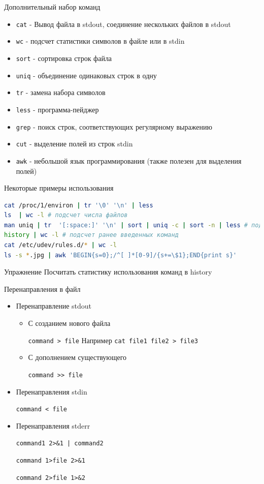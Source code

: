 \documentclass[ignorenonframetext, professionalfonts, hyperref={pdftex, unicode}]{beamer}
\begin{document}
\begin{frame}{Дополнительный набор команд}
  \begin{itemize}
    \item {\tt cat} - Вывод файла в stdout, соединение нескольких файлов в stdout
    \item {\tt wc} - подсчет статистики символов в файле или в stdin 
    \item {\tt sort} - сортировка строк файла
    \item {\tt uniq} - объединение одинаковых строк в одну
    \item {\tt tr} - замена набора символов
    \item {\tt less} - программа-пейджер
    \item {\tt grep} - поиск строк, соответствующих регулярному выражению
    \item {\tt cut} - выделение полей из строк stdin
    \item {\tt awk} - небольшой язык программирования (также полезен для выделения полей)
  \end{itemize}
\end{frame}

\begin{frame}[fragile]{Некоторые примеры использования}
\begin{lstlisting}[language=bash]
cat /proc/1/environ | tr '\0' '\n' | less
ls  | wc -l # подсчет числа файлов
man uniq | tr  '[:space:]' '\n' | sort | uniq -c | sort -n | less # подсчет количества слов в тексте man uniq
history | wc -l # подсчет ранее введенных команд
cat /etc/udev/rules.d/* | wc -l
ls -s *.jpg | awk 'BEGIN{s=0};/^[ ]*[0-9]/{s+=\$1};END{print s}' 
\end{lstlisting}
  \pause
  \begin{block}{Упражнение}
    Посчитать статистику использования команд в history
  \end{block}
\end{frame}

\begin{frame}{Перенаправления в файл}

\begin{itemize}
  \item Перенаправление stdout 
    \begin{itemize}
      \item С созданием нового файла

        {\tt command > file} Например {\tt cat file1 file2 > file3}
      \item С дополнением существующего

		  {\tt command >\phantom{}>  file}
    \end{itemize}
    \pause
  \item Перенаправления stdin

    {\tt command < file}
    \pause
  \item Перенаправления stderr

    {\tt command1 2>\&1 | command2}

   {\tt command 1>file 2>\&1}

   {\tt command 2>file 1>\&2}
\end{itemize}

\end{frame}
\end{document}
